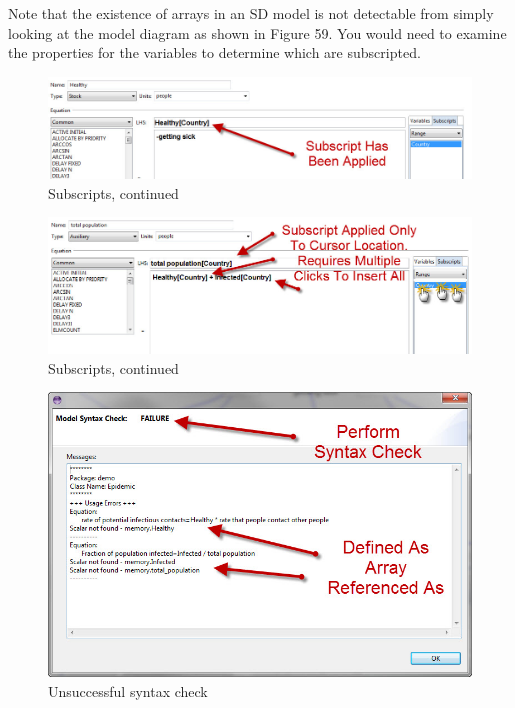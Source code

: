 \documentclass[11pt]{amsart}
\begin{document}
Note that the existence of arrays in an SD model is not detectable from simply looking at the model diagram as shown in Figure 59. You would need to examine the properties for the variables to determine which are subscripted.

\begin{figure}[ht]
\begin{center}
\vspace{.2in}
\centerline {
\includegraphics[totalheight=0.15\textheight]{images/057.jpg}
}
\caption{Subscripts, continued}
\label{fig:057}
\end{center}
\end{figure}




\begin{figure}[ht]
\begin{center}
\vspace{.2in}
\centerline {
\includegraphics[totalheight=0.15\textheight]{images/058.jpg}
}
\caption{Subscripts, continued}
\label{fig:058}
\end{center}
\end{figure}




\begin{figure}[ht]
\begin{center}
\vspace{.2in}
\centerline {
\includegraphics[totalheight=0.35\textheight]{images/059.jpg}
}
\caption{Unsuccessful syntax check}
\label{fig:059}
\end{center}
\end{figure}
\end{document}
